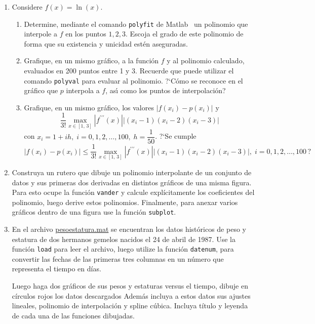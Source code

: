 \documentclass[letterpaper,11pt]{article}
\newcommand{\matlab}{{\sc Matlab} }
\begin{document}
\begin{enumerate}
\item Considere $f(x) = \ln(x)$.
	\begin{enumerate}
		\item \label{interppol} Determine, mediante el comando \Verb+polyfit+ de \matlab\, un polinomio que interpole a $f$ en los puntos
			$1, 2, 3$. Escoja el grado de este polinomio de forma que su existencia y unicidad est\'en aseguradas.
		\item Grafique, en un mismo gr\'afico, a la funci\'on $f$ y al polinomio calculado, evaluados en 200
			puntos entre 1 y 3. Recuerde que puede utilizar
			el comando \Verb+polyval+ para evaluar al polinomio. ?`C\'omo se reconoce en el gr\'afico que $p$ interpola a $f$, as\'{\i}
			como los puntos de interpolaci\'on?
		\item Grafique, en un mismo gr\'afico, los valores $|f(x_i) - p(x_i)|$ y
			\[
				\frac{1}{3!}\max_{x \in [1,\,3]} \left|f^{\prime\prime\prime}(x)\right|\left|(x_i-1)(x_i-2)(x_i-3)\right|
			\]
			con $x_i = 1 + ih,\;i=0,1,2,\ldots,100, \; h = \dfrac{1}{50}$.
			?`Se cumple
			\[
				\left|f(x_i)-p(x_i)\right| \le
					\frac{1}{3!}\max_{x \in [1,\,3]} \left|f^{\prime\prime\prime}(x)\right|\left|(x_i-1)(x_i-2)(x_i-3)\right|,\; i=0,1,2,\ldots,100\,\mbox{?}
			\]
	\end{enumerate}

\item Construya un rutero que dibuje un polinomio interpolante de un conjunto de datos y sus primeras dos derivadas en distintos gr\'aficos de una misma figura. Para esto ocupe la funci\'on \texttt{vander} y calcule expl\'icitamente los coeficientes del polinomio, luego derive estos polinomios. Finalmente, para anexar varios gr\'aficos dentro de una figura use la funci\'on \texttt{subplot}.

\item En el archivo 
\href{ftp://ftp.ing-mat.udec.cl/pub/ing-mat/asignaturas/521230/ejercicios/2018-1/pesoestatura.mat}{pesoestatura.mat} 
se encuentran los datos hist\'oricos de peso y estatura de dos hermanos gemelos nacidos el 24 de abril de 1987. Use la funci\'on \texttt{load} para leer el archivo, luego utilize la funci\'on \texttt{datenum}, para convertir las fechas de las primeras tres columnas en un n\'umero que representa el tiempo en d\'ias.

Luego haga dos gr\'aficos de sus pesos y estaturas versus el tiempo, dibuje en c\'irculos rojos los datos descargados Adem\'as incluya a estos datos sus ajustes lineales, polinomio de interpolaci\'on y spline c\'ubica. Incluya t\'itulo y leyenda de cada una de las funciones dibujadas.


\end{enumerate}
\end{document}
